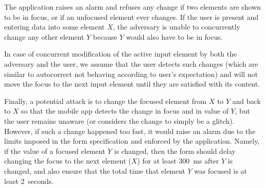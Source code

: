 The application raises an alarm and refuses any change if two elements are shown to be in focus, or if an unfocused element ever changes.
If the user is present and entering data into some element $X$, the adversary is unable to concurrently change any other element $Y$ because $Y$ would also have to be in focus.


In case of concurrent modification of the active input element by both the adversary and the user, we assume that the user detects such changes (which are similar to autocorrect not behaving according to user's expectation) and will not move the focus to the next input element until they are satisfied with its content.


Finally, a potential attack is to change the focused element from $X$ to $Y$ and back to $X$ so that the mobile app detects the change in focus and in value of $Y$, but the user remains unaware (or considers the change to simply be a glitch).
However, if such a change happened too fast, it would raise an alarm due to the limits imposed in the form specification and enforced by the application.
Namely, if the value of a focused element $Y$ is changed, then the form should delay changing the focus to the next element ($X$) for at least 300~ms after $Y$ is changed, and also ensure that the total time that element $Y$ was focused is at least 2~seconds.

